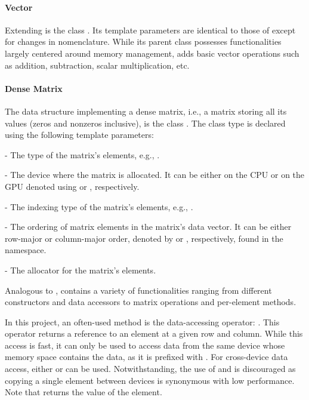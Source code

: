 \paragraph{Vector} Extending  is the  class \cite{ixA8ZYptYohwlgwt}.
Its template parameters are identical to those of  except for changes in nomenclature.
While its parent class possesses functionalities largely centered around memory management,  adds basic vector operations such as addition, subtraction, scalar multiplication, etc.

\paragraph{Dense Matrix} The data structure implementing a dense matrix, i.e., a matrix storing all its values (zeros and nonzeros inclusive), is the  class \cite{ixA8ZYptYohwlgwt}.
The class type is declared using the following template parameters:

\begin{tight_itemize}
	\item {} - The type of the matrix's elements, e.g., .
	\item {} - The device where the matrix is allocated.
It can be either on the CPU or on the GPU denoted using  or , respectively.
	\item {} - The indexing type of the matrix's elements, e.g., .
	\item {} - The ordering of matrix elements in the matrix's data vector.
It can be either row-major or column-major order, denoted by  or , respectively, found in the  namespace.
	\item {} - The allocator for the matrix's elements.
\end{tight_itemize}

Analogous to ,  contains a variety of functionalities ranging from different constructors and data accessors to matrix operations and per-element methods.

In this project, an often-used method is the data-accessing operator: .
This operator returns a reference to an element at a given row and column.
While this access is fast, it can only be used to access data from the same device whose memory space contains the data, as it is prefixed with .
For cross-device data access, either  or  can be used.
Notwithstanding, the use of  and  is discouraged as copying a single element between devices is synonymous with low performance.
Note that  returns the value of the element.

